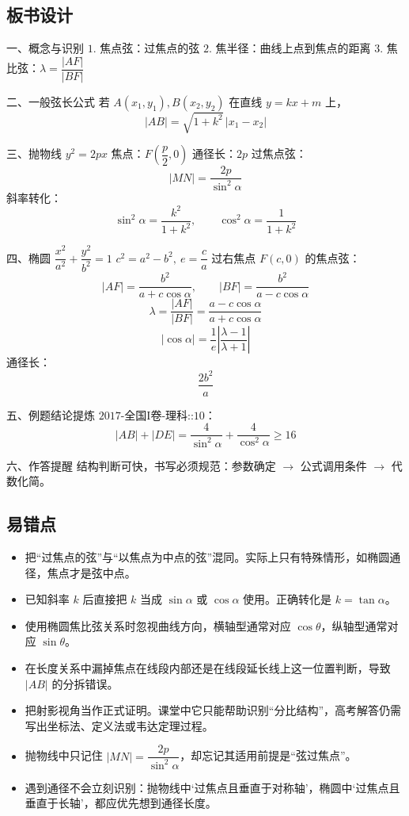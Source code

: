 \documentclass[UTF8,a4paper,11pt]{ctexart}
\begin{document}
\subsection*{板书设计}

一、概念与识别
$1.$ 焦点弦：过焦点的弦
$2.$ 焦半径：曲线上点到焦点的距离
$3.$ 焦比弦：$\lambda=\dfrac{|AF|}{|BF|}$

二、一般弦长公式
若 $A(x_1,y_1),B(x_2,y_2)$ 在直线 $y=kx+m$ 上，
\[
|AB|=\sqrt{1+k^2}\,|x_1-x_2|
\]

三、抛物线 $y^2=2px$
焦点：$F\left(\dfrac p2,0\right)$
通径长：$2p$
过焦点弦：
\[
|MN|=\frac{2p}{\sin^2\alpha}
\]
斜率转化：
\[
\sin^2\alpha=\frac{k^2}{1+k^2},\qquad \cos^2\alpha=\frac{1}{1+k^2}
\]

四、椭圆 $\dfrac{x^2}{a^2}+\dfrac{y^2}{b^2}=1$
$c^2=a^2-b^2,\ e=\dfrac ca$
过右焦点 $F(c,0)$ 的焦点弦：
\[
|AF|=\frac{b^2}{a+c\cos\alpha},\qquad |BF|=\frac{b^2}{a-c\cos\alpha}
\]
\[
\lambda=\frac{|AF|}{|BF|}=\frac{a-c\cos\alpha}{a+c\cos\alpha}
\]
\[
\left|\cos\alpha\right|=\frac{1}{e}\left|\frac{\lambda-1}{\lambda+1}\right|
\]
通径长：
\[
\frac{2b^2}{a}
\]

五、例题结论提炼
$\text{2017-全国I卷-理科::10}$：
\[
|AB|+|DE|=\frac{4}{\sin^2\alpha}+\frac{4}{\cos^2\alpha}\ge 16
\]

六、作答提醒
结构判断可快，书写必须规范：参数确定 $\to$ 公式调用条件 $\to$ 代数化简。

\subsection*{易错点}

\begin{itemize}

\item 把“过焦点的弦”与“以焦点为中点的弦”混同。实际上只有特殊情形，如椭圆通径，焦点才是弦中点。

\item 已知斜率 $k$ 后直接把 $k$ 当成 $\sin\alpha$ 或 $\cos\alpha$ 使用。正确转化是 $k=\tan\alpha$。

\item 使用椭圆焦比弦关系时忽视曲线方向，横轴型通常对应 $\cos\theta$，纵轴型通常对应 $\sin\theta$。

\item 在长度关系中漏掉焦点在线段内部还是在线段延长线上这一位置判断，导致 $|AB|$ 的分拆错误。

\item 把射影视角当作正式证明。课堂中它只能帮助识别“分比结构”，高考解答仍需写出坐标法、定义法或韦达定理过程。

\item 抛物线中只记住 $|MN|=\dfrac{2p}{\sin^2\alpha}$，却忘记其适用前提是“弦过焦点”。

\item 遇到通径不会立刻识别：抛物线中‘过焦点且垂直于对称轴’，椭圆中‘过焦点且垂直于长轴’，都应优先想到通径长度。

\end{itemize}
\end{document}
